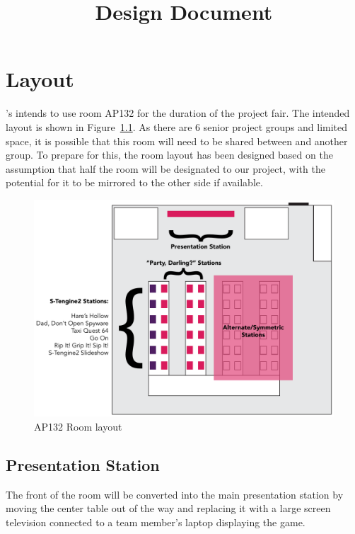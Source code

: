 \documentclass{GlobalDocument}
\begin{document}
\title{Design Document}
\author{\ourteam}



\BgUsetrue %

\chapter{Layout}
\ourteam{}'s intends to use room AP132 for the duration of the project fair. The intended layout is shown in Figure~\ref{fig:layout}. As there are 6 senior project groups and limited space, it is possible that this room will need to be shared between \ourteam{} and another group. To prepare for this, the room layout has been designed based on the assumption that half the room will be designated to our project, with the potential for it to be mirrored to the other side if available.

\begin{figure}[htb]
	\centering
	\includegraphics[width=\textwidth]{images/layout}
	\caption{AP132 Room layout}
	\label{fig:layout}
\end{figure}

\section{Presentation Station}
The front of the room will be converted into the main presentation station by moving the center table out of the way and replacing it with a large screen television connected to a team member's laptop displaying the game.
\end{document}
